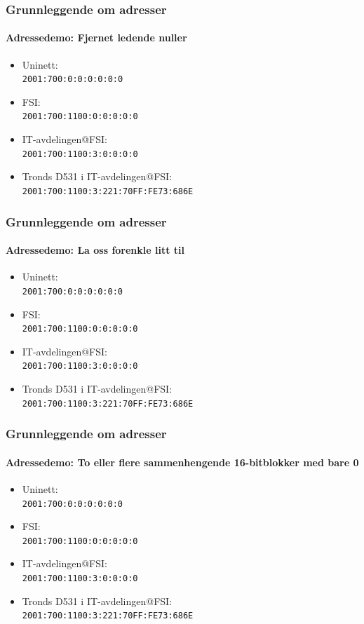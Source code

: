 \begin{frame}
  \frametitle{Grunnleggende om adresser}
  \framesubtitle{Adressedemo: Fjernet ledende nuller}
  \begin{itemize}
  \item Uninett:\\\texttt{2001:\alert{700}:\alert{0}:\alert{0}:\alert{0}:\alert{0}:\alert{0}:\alert{0}\phantom{/32}}
  \item FSI:\\\texttt{2001:\alert{700}:1100:\alert{0}:\alert{0}:\alert{0}:\alert{0}:\alert{0}\phantom{/48}}
  \item IT-avdelingen@FSI:\\\texttt{2001:\alert{700}:1100:\alert{3}:\alert{0}:\alert{0}:\alert{0}:\alert{0}\phantom{/64}}
  \item Tronds D531 i IT-avdelingen@FSI:\\\texttt{2001:\alert{700}:1100:\alert{3}:\alert{221}:70FF:FE73:686E\phantom{/128}}
  \end{itemize}
\end{frame}

\begin{frame}
  \frametitle{Grunnleggende om adresser}
  \framesubtitle{Adressedemo: La oss forenkle litt til}
  \begin{itemize}
  \item Uninett:\\\texttt{2001:700:0:0:0:0:0:0\phantom{/32}}
  \item FSI:\\\texttt{2001:700:1100:0:0:0:0:0\phantom{/48}}
  \item IT-avdelingen@FSI:\\\texttt{2001:700:1100:3:0:0:0:0\phantom{/64}}
  \item Tronds D531 i IT-avdelingen@FSI:\\\texttt{2001:700:1100:3:221:70FF:FE73:686E\phantom{/128}}
  \end{itemize}
\end{frame}

\begin{frame}%
  \frametitle{Grunnleggende om adresser}
  \framesubtitle{Adressedemo: To eller flere sammenhengende 16-bitblokker med bare 0}
  \begin{itemize}
  \item Uninett:\\\texttt{2001:700:\alert{0:0:0:0:0:0}\phantom{/32}}
  \item FSI:\\\texttt{2001:700:1100:\alert{0:0:0:0:0}\phantom{/48}}
  \item IT-avdelingen@FSI:\\\texttt{2001:700:1100:3:\alert{0:0:0:0}\phantom{/64}}
  \item Tronds D531 i IT-avdelingen@FSI:\\\texttt{2001:700:1100:3:221:70FF:FE73:686E\phantom{/128}}
  \end{itemize}
\end{frame}

